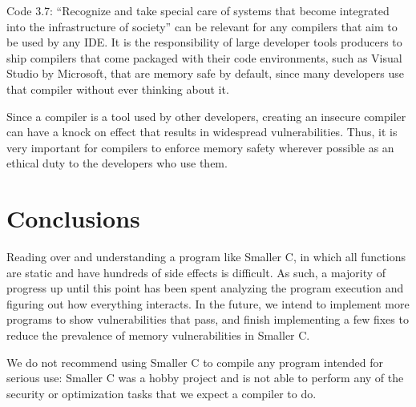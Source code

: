 \documentclass[sigconf, anonymous]{acmart}
\begin{document}
Code 3.7: “Recognize and take special care of systems that become integrated into the infrastructure of society” can be relevant for any compilers that aim to be used by any IDE. It is the responsibility of large developer tools producers to ship compilers that come packaged with their code environments, such as Visual Studio by Microsoft, that are memory safe by default, since many developers use that compiler without ever thinking about it. 

Since a compiler is a tool used by other developers, creating an insecure compiler can have a knock on effect that results in widespread vulnerabilities. Thus, it is very important for compilers to enforce memory safety wherever possible as an ethical duty to the developers who use them.


\section{Conclusions}
\label{conclusions}

Reading over and understanding a program like Smaller C, in which all functions are static and have hundreds of side effects is difficult. As such, a majority of progress up until this point has been spent analyzing the program execution and figuring out how everything interacts. In the future, we intend to implement more programs to show vulnerabilities that pass, and finish implementing a few fixes to reduce the prevalence of memory vulnerabilities in Smaller C. 

We do not recommend using Smaller C to compile any program intended for serious use: Smaller C was a hobby project and is not able to perform any of the security or optimization tasks that we expect a compiler to do. 

\balance
\end{document}
